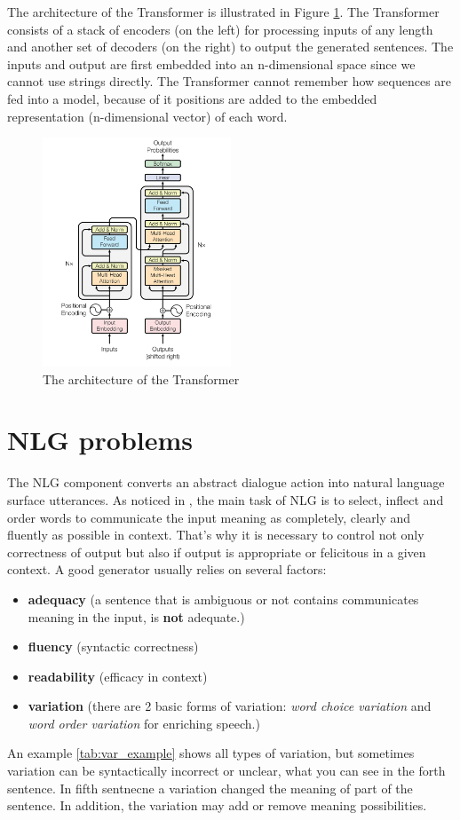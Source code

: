 The architecture of the Transformer is illustrated in Figure \ref{transformer}. The Transformer consists of a stack of encoders (on the left) for processing inputs of any length and another set of decoders (on the right) to output the generated sentences. The inputs and output are first embedded into an n-dimensional space since we cannot use strings directly. The Transformer cannot remember how sequences are fed into a model, because of it positions are added to the embedded representation (n-dimensional vector) of each word.

\begin{figure}[hbt]
  \centering
  \includegraphics[width=0.5\textwidth]{figures/transformer.png}
  \caption{The architecture of the Transformer\cite{transformer}}
  \label{transformer}
\end{figure}

\section{NLG problems}
The NLG component converts an abstract dialogue action into natural language surface utterances. As noticed in \cite{generator_problems}, the main task of NLG is to select, inflect and order words to communicate the input meaning as completely, clearly and fluently as possible in context. That's why it is necessary to control not only correctness of output but also if output is appropriate or felicitous in a given context. A good generator usually relies on several factors:
\begin{itemize}
  \item \textbf{adequacy} (a sentence that is ambiguous or not contains communicates meaning in the input, is \textbf{not} adequate.)  
  \item \textbf{fluency} (syntactic correctness)
  \item \textbf{readability} (efficacy in context)
  \item \textbf{variation} (there are 2 basic forms of variation: \textit{word choice variation} and \textit{word order variation} for enriching speech.)
\end{itemize}
An example \ref{tab:var_example} shows all types of variation, but sometimes variation can be syntactically incorrect or unclear, what you can see in the forth sentence. In fifth sentnecne a variation changed the meaning of part of the sentence. In addition, the variation may add or remove meaning possibilities.

